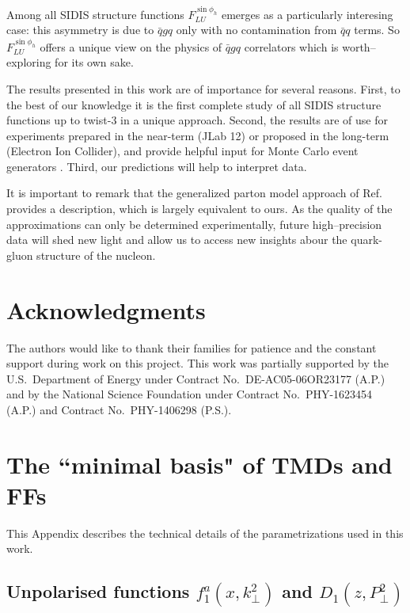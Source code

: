 \documentclass[a4paper,11pt]{article}
\begin{document}
Among all SIDIS structure functions $F_{LU}^{\sin\phi_h}$ emerges as
a particularly interesing case: this asymmetry is due to $\bar qgq$
only with no contamination from $\bar qq$ terms.
So $F_{LU}^{\sin\phi_h}$ offers a unique view on the physics of $\bar qgq$ 
correlators which is worth--exploring for its own sake.

The results presented in this work are of importance for several reasons.
First, to the best of our knowledge it is the first complete study 
of all SIDIS structure functions up to twist-3 in a unique approach. 
Second, the results are of use for experiments prepared in the near-term 
(JLab 12) or proposed in the long-term (Electron Ion Collider),
and provide helpful input for Monte Carlo event generators 
\cite{Avakian:2015vha}.
Third, our predictions will help to interpret data.

It is important to remark that the generalized parton model 
approach of Ref.~\cite{Anselmino:2011ch} provides a description,
which is largely equivalent to ours. As the quality of the 
approximations can only be determined experimentally, future
high--precision data will shed new light and allow us to 
access new insights abour the quark-gluon structure
of the nucleon.


\section{Acknowledgments}
The authors would like to thank their families for patience and
the constant support during work on this project. This work was 
partially supported by the U.S.\ Department of Energy under 
Contract No.~DE-AC05-06OR23177 (A.P.) and by the National 
Science Foundation under Contract No.\ PHY-1623454 (A.P.)
and Contract No.\ PHY-1406298 (P.S.).


 
\newpage
\appendix

\section{\boldmath The ``minimal basis" of TMDs and FFs}
\label{App:basis}

This Appendix describes the technical details of the parametrizations
used in this work.

\subsection{\boldmath Unpolarised functions $f_1^a(x,k_\perp^2)$ 
			and $D_1(z,P_\perp^2)$}
\label{App:basis-f1-D1}
\end{document}
